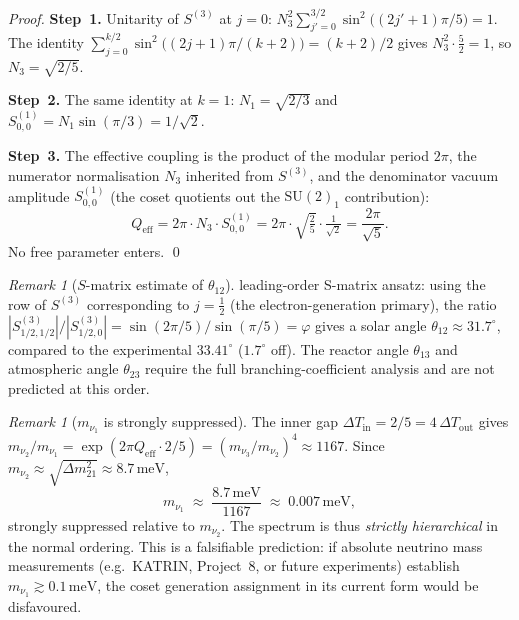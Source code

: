 \documentclass[11pt,a4paper]{article}
\theoremstyle{definition}\newtheorem{definition}[theorem]{Definition}
\theoremstyle{remark}
\newtheorem{remark}[theorem]{Remark}
\newcommand{\vp}{\varphi}
\newcommand{\SU}{\mathrm{SU}}
\begin{document}
\begin{proof}
\textbf{Step~1.} Unitarity of $S^{(3)}$ at $j=0$:
$N_3^2\!\sum_{j'=0}^{3/2}\sin^2\!\bigl((2j'{+}1)\pi/5\bigr)=1$.
The identity
$\sum_{j=0}^{k/2}\sin^2\!\bigl((2j{+}1)\pi/(k{+}2)\bigr)=(k{+}2)/2$
gives $N_3^2\cdot\tfrac52=1$, so $N_3=\sqrt{2/5}$.

\textbf{Step~2.} The same identity at $k=1$:
$N_1=\sqrt{2/3}$ and $S^{(1)}_{0,0}=N_1\sin(\pi/3)=1/\!\sqrt{2}$.

\textbf{Step~3.} The effective coupling is the product of the modular
period $2\pi$, the numerator normalisation $N_3$ inherited from $S^{(3)}$,
and the denominator vacuum amplitude $S^{(1)}_{0,0}$ (the coset
quotients out the $\SU(2)_1$ contribution):
\[
  Q_{\mathrm{eff}}
  = 2\pi\cdot N_3\cdot S^{(1)}_{0,0}
  = 2\pi\cdot\sqrt{\tfrac{2}{5}}\cdot\tfrac{1}{\sqrt{2}}
  = \frac{2\pi}{\sqrt{5}}.
\]
No free parameter enters.
\qed
\end{proof}

\begin{remark}[$S$-matrix estimate of $\theta_{12}$]
\label{P17:rem:Smat_phi}
leading-order S-matrix ansatz: using the row of $S^{(3)}$
corresponding to $j=\tfrac{1}{2}$ (the electron-generation
primary), the ratio
$|S_{1/2,1/2}^{(3)}|/|S_{1/2,0}^{(3)}|=\sin(2\pi/5)/\sin(\pi/5)=\vp$
gives a solar angle $\theta_{12}\approx31.7^\circ$, compared to
the experimental $33.41^\circ$ ($1.7^\circ$ off).
The reactor angle $\theta_{13}$ and atmospheric angle $\theta_{23}$
require the full branching-coefficient analysis and are not
predicted at this order.
\end{remark}

\begin{remark}[$m_{\nu_1}$ is strongly suppressed]
\label{P17:rem:m1_suppressed}
The inner gap $\Delta T_{\mathrm{in}}=2/5=4\,\Delta T_{\mathrm{out}}$
gives $m_{\nu_2}/m_{\nu_1}=\exp(2\pi Q_{\mathrm{eff}}\cdot2/5)
=(m_{\nu_3}/m_{\nu_2})^4\approx1167$.  Since
$m_{\nu_2}\approx\sqrt{\Delta m^2_{21}}\approx8.7\,\mathrm{meV}$,
\begin{equation}
  m_{\nu_1} \;\approx\; \frac{8.7\,\mathrm{meV}}{1167}
             \;\approx\; 0.007\,\mathrm{meV},
  \label{P17:eq:m1_pred}
\end{equation}
strongly suppressed relative to $m_{\nu_2}$.  The spectrum is
thus \emph{strictly hierarchical} in the normal ordering.
This is a falsifiable prediction: if absolute neutrino mass
measurements (e.g.\ KATRIN, Project~8, or future experiments)
establish $m_{\nu_1}\gtrsim0.1\,\mathrm{meV}$, the coset
generation assignment in its current form would be disfavoured.
\end{remark}
\end{document}
